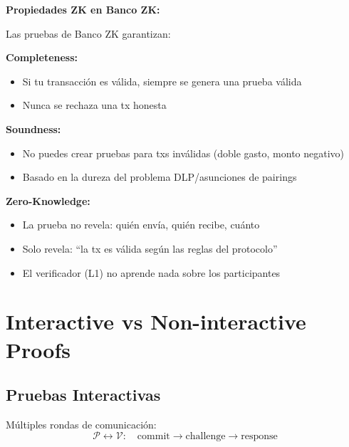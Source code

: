 \documentclass[11pt,a4paper,twoside,openright]{book}
\theoremstyle{definition}
\theoremstyle{plain}
\theoremstyle{remark}
\begin{document}
\begin{bancozk}
\textbf{Propiedades ZK en Banco ZK:}

Las pruebas de Banco ZK garantizan:

\textbf{Completeness:}
\begin{itemize}
    \item Si tu transacción es válida, siempre se genera una prueba válida
    \item Nunca se rechaza una tx honesta
\end{itemize}

\textbf{Soundness:}
\begin{itemize}
    \item No puedes crear pruebas para txs inválidas (doble gasto, monto negativo)
    \item Basado en la dureza del problema DLP/asunciones de pairings
\end{itemize}

\textbf{Zero-Knowledge:}
\begin{itemize}
    \item La prueba no revela: quién envía, quién recibe, cuánto
    \item Solo revela: ``la tx es válida según las reglas del protocolo''
    \item El verificador (L1) no aprende nada sobre los participantes
\end{itemize}
\end{bancozk}


\section{Interactive vs Non-interactive Proofs}

\subsection{Pruebas Interactivas}

Múltiples rondas de comunicación:
\[
\mathcal{P} \leftrightarrow \mathcal{V}: \quad \text{commit} \to \text{challenge} \to \text{response}
\]
\end{document}
